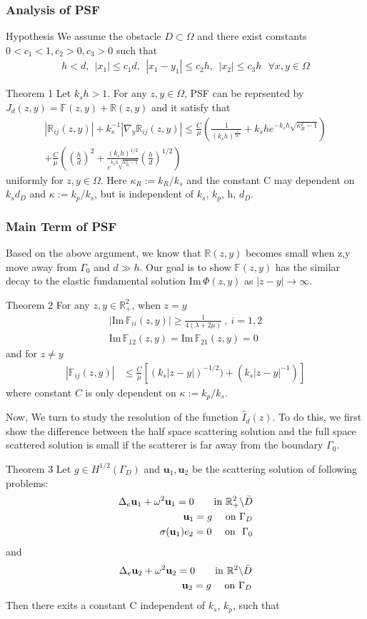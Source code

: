 \documentclass[cjk,8pt]{beamer}
\newcommand{\R}{\mathbb{R}}
\renewcommand{\Im}{\mathrm{Im}\,}
\newcommand{\na}{\nabla}
\newcommand{\Ga}{\Gamma}
\newcommand{\Om}{\Omega}
\newcommand{\bks}{\backslash}
\renewcommand{\u}{\mathbf{u}}
\renewcommand{\Im}{\mathrm{Im}\,}
\newcommand{\F}{\mathbb{F}}
\newcommand{\ben}{\begin{eqnarray*}}
\newcommand{\een}{\end{eqnarray*}}
\begin{document}
\begin{CJK*}{GBK}{kai}
\begin{frame}
\frametitle{Analysis of PSF}
\begin{block}{Hypothesis}
 We assume the obstacle $D\subset\Omega$ and there exist constants $0<c_1<1,c_2>0,c_3>0$ such that
\ben\label{convention_2}
h<d, \ \ |x_1|\leq c_1 d , \ \ |x_1-y_1|\leq c_2 h , \ \
|x_2|\leq c_3 h    \ \ \ \forall x,y \in \Omega
\een
\end{block}
\begin{block}{Theorem 1}
	Let $k_s h>1$. For any $z,y\in\Om$, PSF can be reprsented by  $J_d(z,y)=\F(z,y)+\R(z,y)$ and it satisfy that
	\ben
	|\R_{ij}(z,y)|+k_s^{-1}|\na_y \R_{ij}(z,y)|\leq \frac{C}{\mu}(\frac{1}{(k_s h)^{\frac{1}{2n^*}}}
    +k_she^{-k_s h\sqrt{\kappa_R^2-1}}) \\ +\frac{C}{\mu} ((\frac{h}{d})^{2}+\frac{(k_s h)^{1/2}}{ e^{k_s h\sqrt{\kappa_R^2-1}}}(\frac{h}{d})^{1/2})
	\een
	uniformly for $z,y\in\Om$. Here $\kappa_R:=k_R/k_s$ and the constant C may dependent on $k_s d_D$ and $\kappa:=k_p/k_s$, but is independent of $k_s$, $k_p$, h, $d_D$.
\end{block}
\end{frame}

\begin{frame}
\frametitle{Main Term of PSF}
Based on the above argument, we know that $\R(z,y)$ becomes small when z,y move away from $\Gamma_0$ and $d\gg h$. Our goal is to show $\F(z,y)$ has the similar decay to the elastic fundamental solution $\Im\Phi(z,y)$ as $|z-y|\to\infty$.
\begin{block}{Theorem 2}
	For any $z,y\in \R_+^2$, when $z=y$
	\ben
	|\Im \F_{ii}(z,y)| \geq \frac{1}{4(\lambda+2\mu)} \ , \ i =1 ,2 \\
	\Im \F_{12}(z,y) = \Im \F_{21}(z,y) =0
	\een
	and for $z\neq y$
	\ben
	|\F_{ij}(z,y)|&\le \frac{C}{\mu}[(k_s|z-y|)^{-1/2})+(k_s|z-y|^{-1})]
	\een
	where constant $C$ is only dependent on $\kappa:=k_p/k_s$.
\end{block}
\end{frame}
\begin{frame}
Now, We turn to  study the resolution of the function $\hat{I}_d(z)$. To do this, we first show the difference between the half space scattering solution and the full space scattered solution is small if the scatterer is far away from the boundary $\Ga_0$.
\begin{block}{Theorem 3}
	Let $g\in H^{1/2}(\Ga_D)$ and $\u_1,\u_2$ be the scattering solution of following problems:
	\ben\label{elas_r1}
	\Delta_e \u_1 + \omega^2 \u_1=0 \qquad\mbox{\rm in } \R^2_+\bks \bar{D}\\
	\u_1= g \ \ \ \ \mbox{\rm on } \Ga_D  \label{elas_rbd}\\
	\sigma(\u_1)e_2=0 \ \ \ \ \mbox{\rm on} \ \ \Ga_0 \label{elas_rb0}
	\een
	and
	\ben {\label{elas_r2}}
	\Delta_e \u_2 + \omega^2 \u_2=0 \qquad\mbox{\rm in } \R^2\bks \bar{D}\\
	\u_2 = g \ \ \ \ \mbox{\rm on } \Ga_D  \label{elas_rbd2}
	\een
	Then there exits a constant C independent of $k_s$, $k_p$, such that


\end{block}
\end{frame}
\end{CJK*}
\end{document}
